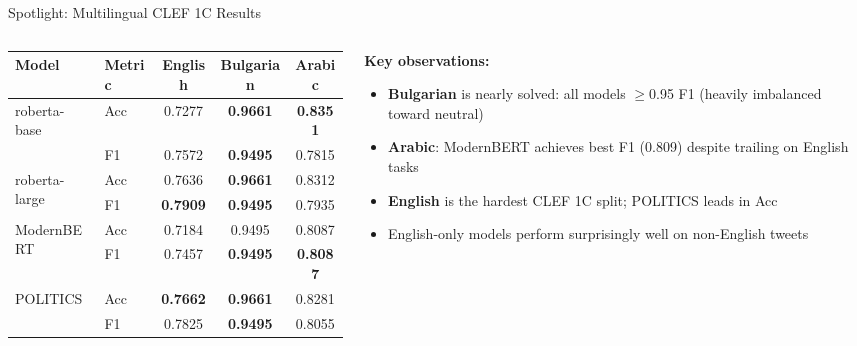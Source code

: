 \documentclass[aspectratio=169]{beamer}
\newcommand{\best}[1]{\textcolor{bestcolor}{\textbf{#1}}}
\begin{document}
\begin{frame}{Spotlight: Multilingual CLEF 1C Results}
  \begin{columns}[T]
    \begin{column}{0.55\textwidth}
      \begin{table}
        \centering
        \small
        \begin{adjustbox}{max width=\textwidth}
        \begin{tabular}{llccc}
          \toprule
          \textbf{Model} & \textbf{Metric}
            & \textbf{English} & \textbf{Bulgarian} & \textbf{Arabic} \\
          \midrule
          \multirow{2}{*}{roberta-base}
            & Acc & 0.7277          & \best{0.9661} & \best{0.8351} \\
            & F1  & 0.7572          & \best{0.9495} & 0.7815 \\
          \midrule
          \multirow{2}{*}{roberta-large}
            & Acc & 0.7636          & \best{0.9661} & 0.8312 \\
            & F1  & \best{0.7909}   & \best{0.9495} & 0.7935 \\
          \midrule
          \multirow{2}{*}{ModernBERT}
            & Acc & 0.7184          & 0.9495        & 0.8087 \\
            & F1  & 0.7457          & \best{0.9495} & \best{0.8087} \\
          \midrule
          \multirow{2}{*}{POLITICS}
            & Acc & \best{0.7662}   & \best{0.9661} & 0.8281 \\
            & F1  & 0.7825          & \best{0.9495} & 0.8055 \\
          \bottomrule
        \end{tabular}
        \end{adjustbox}
      \end{table}
    \end{column}
    \begin{column}{0.42\textwidth}
      \textbf{Key observations:}
      \begin{itemize}
        \item \textbf{Bulgarian} is nearly solved: all models $\geq$0.95 F1 (heavily imbalanced toward neutral)
        \item \textbf{Arabic}: ModernBERT achieves best F1 (0.809) despite trailing on English tasks
        \item \textbf{English} is the hardest CLEF 1C split; POLITICS leads in Acc
        \item English-only models perform surprisingly well on non-English tweets
      \end{itemize}
    \end{column}
  \end{columns}
\end{frame}
\end{document}
